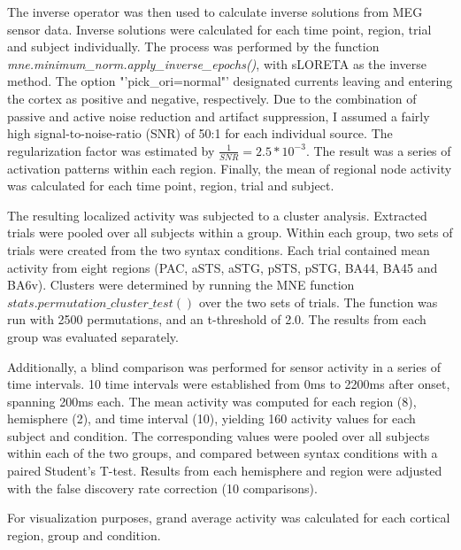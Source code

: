 The inverse operator was then used to calculate inverse solutions from MEG sensor data.
Inverse solutions were calculated for each time point, region, trial and subject individually.
The process was performed by the function \emph{mne.minimum\_norm.apply\_inverse\_epochs()}, with sLORETA as the inverse method.
The option "'pick\_ori=normal"' designated currents leaving and entering the cortex as positive and negative, respectively.
Due to the combination of passive and active noise reduction and artifact suppression, I assumed a fairly high signal-to-noise-ratio (SNR) of 50:1 for each individual source.
The regularization factor was estimated by $\frac{1}{SNR} = 2.5*10^{-3}$.
The result was a series of activation patterns within each region.
Finally, the mean of regional node activity was calculated for each time point, region, trial and subject.


The resulting localized activity was subjected to a cluster analysis.
Extracted trials were pooled over all subjects within a group.
Within each group, two sets of trials were created from the two syntax conditions.
Each trial contained mean activity from eight regions (PAC, aSTS, aSTG, pSTS, pSTG, BA44, BA45 and BA6v).
Clusters were determined by running the MNE function $stats.permutation\_cluster\_test()$ \cite{3.3.clustertest} over the two sets of trials.
The function was run with 2500 permutations, and an t-threshold of 2.0.
The results from each group was evaluated separately.

Additionally, a blind comparison was performed for sensor activity in a series of time intervals.
10 time intervals were established from 0ms to 2200ms after onset, spanning 200ms each.
The mean activity was computed for each region (8), hemisphere (2), and time interval (10), yielding 160 activity values for each subject and condition.
The corresponding values were pooled over all subjects within each of the two groups, and compared between syntax conditions with a paired Student's T-test.
Results from each hemisphere and region were adjusted with the false discovery rate correction (10 comparisons).

For visualization purposes, grand average activity was calculated for each cortical region, group and condition.